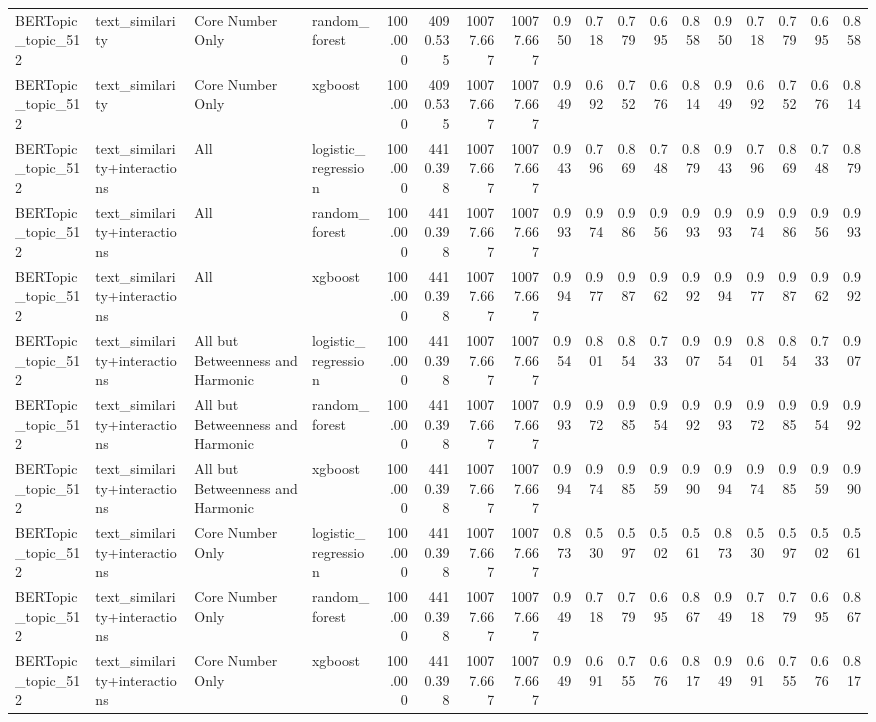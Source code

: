 \begin{tabular}{llllrrrrrrrrrrrrrr}
BERTopic_topic_512 & text_similarity & Core Number Only & random_forest & 100.000 & 4090.535 & 10077.667 & 10077.667 & 0.950 & 0.718 & 0.779 & 0.695 & 0.858 & 0.950 & 0.718 & 0.779 & 0.695 & 0.858 \\
BERTopic_topic_512 & text_similarity & Core Number Only & xgboost & 100.000 & 4090.535 & 10077.667 & 10077.667 & 0.949 & 0.692 & 0.752 & 0.676 & 0.814 & 0.949 & 0.692 & 0.752 & 0.676 & 0.814 \\
BERTopic_topic_512 & text_similarity+interactions & All & logistic_regression & 100.000 & 4410.398 & 10077.667 & 10077.667 & 0.943 & 0.796 & 0.869 & 0.748 & 0.879 & 0.943 & 0.796 & 0.869 & 0.748 & 0.879 \\
BERTopic_topic_512 & text_similarity+interactions & All & random_forest & 100.000 & 4410.398 & 10077.667 & 10077.667 & 0.993 & 0.974 & 0.986 & 0.956 & 0.993 & 0.993 & 0.974 & 0.986 & 0.956 & 0.993 \\
BERTopic_topic_512 & text_similarity+interactions & All & xgboost & 100.000 & 4410.398 & 10077.667 & 10077.667 & 0.994 & 0.977 & 0.987 & 0.962 & 0.992 & 0.994 & 0.977 & 0.987 & 0.962 & 0.992 \\
BERTopic_topic_512 & text_similarity+interactions & All but Betweenness and Harmonic & logistic_regression & 100.000 & 4410.398 & 10077.667 & 10077.667 & 0.954 & 0.801 & 0.854 & 0.733 & 0.907 & 0.954 & 0.801 & 0.854 & 0.733 & 0.907 \\
BERTopic_topic_512 & text_similarity+interactions & All but Betweenness and Harmonic & random_forest & 100.000 & 4410.398 & 10077.667 & 10077.667 & 0.993 & 0.972 & 0.985 & 0.954 & 0.992 & 0.993 & 0.972 & 0.985 & 0.954 & 0.992 \\
BERTopic_topic_512 & text_similarity+interactions & All but Betweenness and Harmonic & xgboost & 100.000 & 4410.398 & 10077.667 & 10077.667 & 0.994 & 0.974 & 0.985 & 0.959 & 0.990 & 0.994 & 0.974 & 0.985 & 0.959 & 0.990 \\
BERTopic_topic_512 & text_similarity+interactions & Core Number Only & logistic_regression & 100.000 & 4410.398 & 10077.667 & 10077.667 & 0.873 & 0.530 & 0.597 & 0.502 & 0.561 & 0.873 & 0.530 & 0.597 & 0.502 & 0.561 \\
BERTopic_topic_512 & text_similarity+interactions & Core Number Only & random_forest & 100.000 & 4410.398 & 10077.667 & 10077.667 & 0.949 & 0.718 & 0.779 & 0.695 & 0.867 & 0.949 & 0.718 & 0.779 & 0.695 & 0.867 \\
BERTopic_topic_512 & text_similarity+interactions & Core Number Only & xgboost & 100.000 & 4410.398 & 10077.667 & 10077.667 & 0.949 & 0.691 & 0.755 & 0.676 & 0.817 & 0.949 & 0.691 & 0.755 & 0.676 & 0.817 \\
\bottomrule
\end{tabular}
